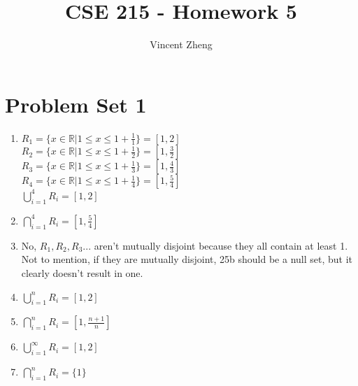 \documentclass[12pt]{article}
\author{Vincent Zheng}
\begin{document}
\title{CSE 215 - Homework 5}
\maketitle

\section*{Problem Set 1}
\begin{enumerate}[label = 25\alph*.]

    \item
        $R_1 = \{x \in \mathbb{R} | 1 \leq x \leq 1 + \frac{1}{1}\} = [1, 2]$ \\
        $R_2 = \{x \in \mathbb{R} | 1 \leq x \leq 1 + \frac{1}{2}\} = [1, \frac{3}{2}]$ \\
        $R_3 = \{x \in \mathbb{R} | 1 \leq x \leq 1 + \frac{1}{3}\} = [1, \frac{4}{3}]$ \\
        $R_4 = \{x \in \mathbb{R} | 1 \leq x \leq 1 + \frac{1}{4}\} = [1, \frac{5}{4}]$ \\
        $\bigcup\limits_{i=1}^{4} R_i = [1, 2]$
    \item 
        $\bigcap\limits_{i=1}^{4} R_i = [1, \frac{5}{4}]$
    \item 
        No, $R_1, R_2, R_3 ...$ aren't mutually disjoint because they all contain at least 1.
        Not to mention, if they are mutually disjoint, 25b should be a null set, but it 
        clearly doesn't result in one.
    \item
        $\bigcup\limits_{i=1}^{n} R_i = [1, 2]$
    \item 
        $\bigcap\limits_{i=1}^{n} R_i = [1, \frac{n + 1}{n}]$
    \item 
        $\bigcup\limits_{i=1}^{\infty} R_i = [1, 2]$
    \item 
        $\bigcap\limits_{i=1}^{n} R_i = \{1\}$

\end{enumerate}
\end{document}
